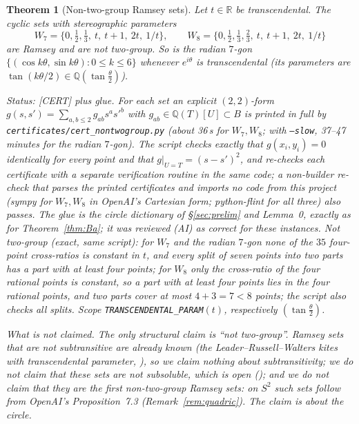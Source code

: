 \documentclass[11pt]{amsart}
\newcommand{\st}[1]{\textsf{[#1]}}
\newcommand{\Q}{\mathbb{Q}}
\newcommand{\R}{\mathbb{R}}
\theoremstyle{plain}
\newtheorem{theorem}{Theorem}[section]
\theoremstyle{definition}
\begin{document}
\begin{theorem}[Non-two-group Ramsey sets]\label{thm:NTG}
Let $t\in\R$ be transcendental. The cyclic sets with stereographic parameters
\[
 W_7=\{0,\tfrac12,\tfrac13,\ t,\ t+1,\ 2t,\ 1/t\},\qquad
 W_8=\{0,\tfrac12,\tfrac13,\tfrac23,\ t,\ t+1,\ 2t,\ 1/t\}
\]
are Ramsey and are not two-group. So is the radian $7$-gon $\{(\cos k\theta,\sin k\theta):0\le k\le6\}$
whenever $e^{i\theta}$ is transcendental (its parameters are $\tan(k\theta/2)\in\Q(\tan\tfrac\theta2)$).

\smallskip\noindent\emph{Status:} \st{CERT} plus glue. For each set an explicit $(2,2)$-form
$g(s,s')=\sum_{a,b\le2}g_{ab}s^as'^b$ with $g_{ab}\in\Q(T)[U]\subset B$ is printed in full by
\texttt{certificates/cert\_nontwogroup.py} (about 36\,s for $W_7,W_8$; with \texttt{--slow}, 37--47
minutes for the radian $7$-gon). The script checks exactly that $g(x_i,y_i)=0$ identically for every
point and that $g|_{U=T}=(s-s')^2$, and re-checks each certificate with a separate verification routine
in the same code; a non-builder re-check that parses the printed certificates and imports no code
from this project (sympy for $W_7,W_8$ in OpenAI's Cartesian form; python-flint for all three) also passes. The
glue is the circle dictionary of \S\ref{sec:prelim} and Lemma~0, exactly as for Theorem~\ref{thm:Ba};
it was reviewed (AI) as correct for these instances.
Not two-group (exact, same script): for $W_7$ and the radian $7$-gon none of the $35$ four-point
cross-ratios is constant in $t$, and every split of seven points into two parts has a part with at least
four points; for $W_8$ only the cross-ratio of the four rational points is constant, so a part with at
least four points lies in the four rational points, and two parts cover at most $4+3=7<8$ points; the
script also checks all splits. Scope \texttt{TRANSCENDENTAL\_PARAM}$(t)$, respectively
$(\tan\tfrac\theta2)$.

\smallskip\noindent\emph{What is not claimed.} The only structural claim is ``not two-group''. Ramsey
sets that are not subtransitive are already known (the Leader--Russell--Walters kites with
transcendental parameter, \cite[Cor.~7.5]{OAI172}), so we claim nothing about subtransitivity; we
do not claim that these sets are not subsoluble, which is open (\cite[Question~6.1]{Behague}); and we
do not claim that they are the first non-two-group Ramsey sets: on $S^2$ such sets follow from
OpenAI's Proposition~7.3 (Remark~\ref{rem:quadric}). The claim is about the circle.
\end{theorem}
\end{document}
